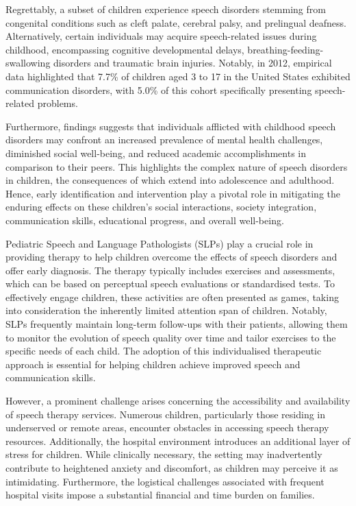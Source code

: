 Regrettably, a subset of children experience speech disorders stemming from congenital conditions such as cleft palate, cerebral palsy, and prelingual deafness. Alternatively, certain individuals may acquire speech-related issues during childhood, encompassing cognitive developmental delays, breathing-feeding-swallowing disorders and traumatic brain injuries. Notably, in 2012, empirical data \cite{black2015communication} highlighted that 7.7\% of children aged 3 to 17 in the United States exhibited communication disorders, with 5.0\% of this cohort specifically presenting speech-related problems.

Furthermore, findings \cite{langbecker2020long} suggests that individuals afflicted with childhood speech disorders may confront an increased prevalence of mental health challenges, diminished social well-being, and reduced academic accomplishments in comparison to their peers. This highlights the complex nature of speech disorders in children,  the consequences of which extend into adolescence and adulthood. Hence,  early identification and intervention play a pivotal role in mitigating the enduring effects on these children's social interactions, society integration, communication skills, educational progress, and overall well-being.

Pediatric Speech and Language Pathologists (SLPs) play a crucial role in providing therapy to help children overcome the effects of speech disorders and offer early diagnosis. The therapy typically includes exercises and assessments, which can be based on perceptual speech evaluations or standardised tests. To effectively engage children, these activities are often presented as games, taking into consideration the inherently limited attention span of children. Notably, SLPs frequently maintain long-term follow-ups with their patients, allowing them to monitor the evolution of speech quality over time and tailor exercises to the specific needs of each child. The adoption of this individualised therapeutic approach is essential for helping children achieve improved speech and communication skills.

However, a prominent challenge arises concerning the accessibility and availability of speech therapy services. Numerous children, particularly those residing in underserved or remote areas, encounter obstacles in accessing speech therapy resources. Additionally, the hospital environment introduces an additional layer of stress for children. While clinically necessary, the setting may inadvertently contribute to heightened anxiety and discomfort, as children may perceive it as intimidating. Furthermore, the logistical challenges associated with frequent hospital visits impose a substantial financial and time burden on families.


